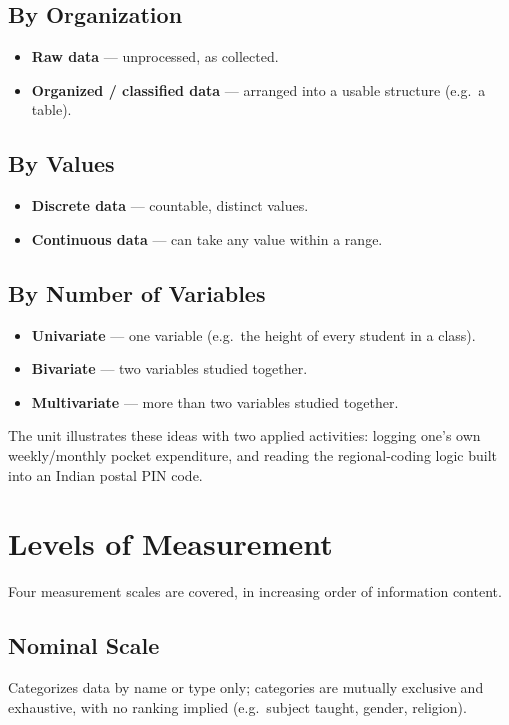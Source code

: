 \documentclass[11pt]{article}
\begin{document}
	\subsection{By Organization}
	\begin{itemize}[leftmargin=*]
		\item \textbf{Raw data} --- unprocessed, as collected.
		\item \textbf{Organized / classified data} --- arranged into a usable structure (e.g.\ a table).
	\end{itemize}
	
	\subsection{By Values}
	\begin{itemize}[leftmargin=*]
		\item \textbf{Discrete data} --- countable, distinct values.
		\item \textbf{Continuous data} --- can take any value within a range.
	\end{itemize}
	
	\subsection{By Number of Variables}
	\begin{itemize}[leftmargin=*]
		\item \textbf{Univariate} --- one variable (e.g.\ the height of every student in a class).
		\item \textbf{Bivariate} --- two variables studied together.
		\item \textbf{Multivariate} --- more than two variables studied together.
	\end{itemize}
	
	\begin{notebox}
		The unit illustrates these ideas with two applied activities: logging one's own weekly/monthly pocket expenditure, and reading the regional-coding logic built into an Indian postal PIN code.
	\end{notebox}
	
	\section{Levels of Measurement}
	
	Four measurement scales are covered, in increasing order of information content.
	
	\subsection{Nominal Scale}
	Categorizes data by name or type only; categories are mutually exclusive and exhaustive, with no ranking implied (e.g.\ subject taught, gender, religion).
	
\end{document}
